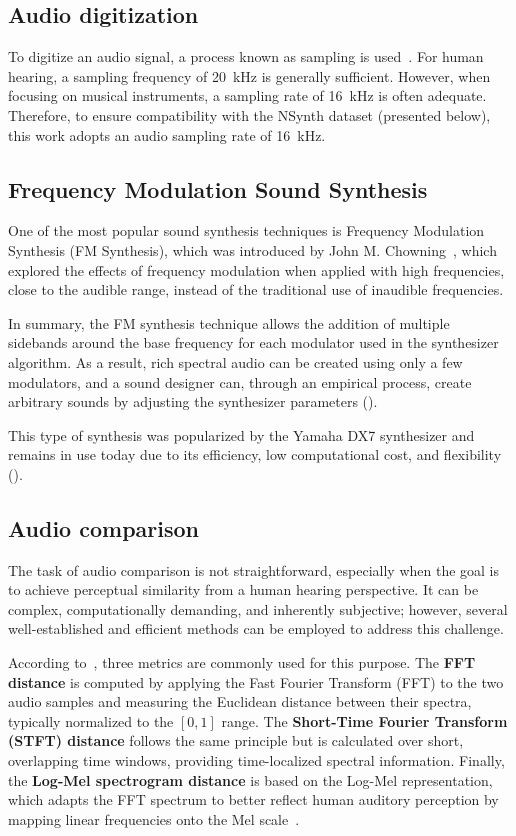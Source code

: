\documentclass[10pt,conference]{IEEEtran}
\begin{document}
\subsection{Audio digitization}

To digitize an audio signal, a process known as sampling is used~\cite{po2022sampling}. For human hearing, a sampling frequency of 20~kHz is generally sufficient. However, when focusing on musical instruments, a sampling rate of 16~kHz is often adequate. Therefore, to ensure compatibility with the NSynth dataset (presented below), this work adopts an audio sampling rate of 16~kHz.

\subsection{Frequency Modulation Sound Synthesis}

One of the most popular sound synthesis techniques is Frequency Modulation Synthesis (FM Synthesis), which was introduced by John M. Chowning~\cite{chowning1973synthesis}, which explored the effects of frequency modulation when applied with high frequencies, close to the audible range, instead of the traditional use of inaudible frequencies.

In summary, the FM synthesis technique allows the addition of multiple sidebands around the base frequency for each modulator used in the synthesizer algorithm. As a result, rich spectral audio can be created using only a few modulators, and a sound designer can, through an empirical process, create arbitrary sounds by adjusting the synthesizer parameters (\cite{lazzarini2023higherorder}).

This type of synthesis was popularized by the Yamaha DX7 synthesizer and remains in use today due to its efficiency, low computational cost, and flexibility (\cite{steinmetz2022ddx7}).

\subsection{Audio comparison}

The task of audio comparison is not straightforward, especially when the goal is to achieve perceptual similarity from a human hearing perspective. It can be complex, computationally demanding, and inherently subjective; however, several well-established and efficient methods can be employed to address this challenge.

According to~\cite{claesson2021resynthesis}, three metrics are commonly used for this purpose. The \textbf{FFT distance} is computed by applying the Fast Fourier Transform (FFT) to the two audio samples and measuring the Euclidean distance between their spectra, typically normalized to the $[0,1]$ range. The \textbf{Short-Time Fourier Transform (STFT) distance} follows the same principle but is calculated over short, overlapping time windows, providing time-localized spectral information. Finally, the \textbf{Log-Mel spectrogram distance} is based on the Log-Mel representation, which adapts the FFT spectrum to better reflect human auditory perception by mapping linear frequencies onto the Mel scale~\cite{claesson2021resynthesis,chulev2024improving}.
\end{document}
